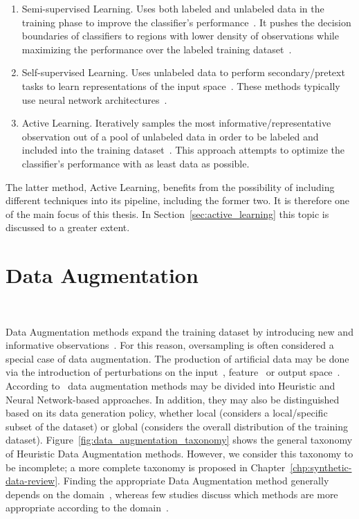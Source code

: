 \begin{enumerate}
    \item Semi-supervised Learning. Uses both labeled and unlabeled data in
        the training phase to improve the classifier's
        performance~\cite{ouali2020overview}. It pushes the decision
        boundaries of classifiers to regions with lower density of
        observations while maximizing the performance over the labeled
        training dataset~\cite{chapelle2009semi}.
    \item Self-supervised Learning. Uses unlabeled data to perform
        secondary/pretext tasks to learn representations of the input
        space~\cite{grill2020bootstrap}. These methods typically use neural
        network architectures~\cite{liu2021self}.
    \item Active Learning. Iteratively samples the most
        informative/representative observation out of a pool of unlabeled data
        in order to be labeled and included into the training
        dataset~\cite{budd2021survey}. This approach attempts to optimize the
        classifier's performance with as least data as possible.
\end{enumerate}

The latter method, Active Learning, benefits from the possibility of including
different techniques into its pipeline, including the former two. It is
therefore one of the main focus of this thesis. In
Section~\ref{sec:active_learning} this topic is discussed to a greater extent.

\section{Data Augmentation}~\label{sec:data_augmentation}

Data Augmentation methods expand the training dataset by introducing new and
informative observations~\cite{Behpour2019}. For this reason, oversampling is
often considered a special case of data augmentation. The production of
artificial data may be done via the introduction of perturbations on the
input~\cite{Zhong2020}, feature~\cite{DeVries2017} or output
space~\cite{Behpour2019}. According to~\citet{Shorten2019} data augmentation
methods may be divided into Heuristic and Neural Network-based approaches. In
addition, they may also be distinguished based on its data generation policy,
whether local (considers a local/specific subset of the dataset) or global
(considers the overall distribution of the training dataset).
Figure~\ref{fig:data_augmentation_taxonomy} shows the general taxonomy of
Heuristic Data Augmentation methods. However, we consider this taxonomy to be
incomplete; a more complete taxonomy is proposed in
Chapter~\ref{chp:synthetic-data-review}. Finding the appropriate Data
Augmentation method generally depends on the domain~\cite{DeVries2017},
whereas few studies discuss which methods are more appropriate according to
the domain~\cite{Shorten2019, Iwana2021, Wong2016}.

